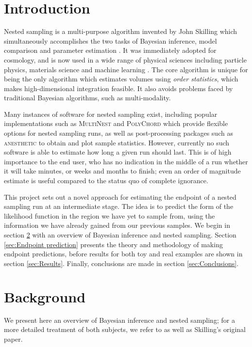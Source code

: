 \documentclass[usenatbib]{mnras} %
\begin{document}
\section{Introduction}
Nested sampling is a multi-purpose algorithm invented by John Skilling which simultaneously accomplishes the two tasks of Bayesian inference, model comparison and parameter estimation \citep{skilling}. It was immediately adopted for cosmology, and is now used in a wide range of physical sciences including particle physics, materials science \citep{physical_scientists} and machine learning \citep{split}. The core algorithm is unique for being the only algorithm which estimates volumes using \textit{order statistics}, which makes high-dimensional integration feasible. It also avoids problems faced by traditional Bayesian algorithms, such as multi-modality.
\par
Many instances of software for nested sampling exist, including popular implementations such as \textsc{MultiNest} \citep{multinest} and \textsc{PolyChord} \citep{polychord} which provide flexible options for nested sampling runs, as well as post-processing packages such as \textsc{anesthetic} \citep{anesthetic} to obtain and plot sample statistics. However, currently no such software is able to estimate how long a given run should last. This is of high importance to the end user, who has no indication in the middle of a run whether it will take minutes, or weeks and months to finish; even an order of magnitude estimate is useful compared to the status quo of complete ignorance.
\par
This project sets out a novel approach for estimating the endpoint of a nested sampling run at an intermediate stage. The idea is to predict the form of the likelihood function in the region we have yet to sample from, using the information we have already gained from our previous samples. We begin in section \ref{sec:Background} with an overview of Bayesian inference and nested sampling. Section \ref{sec:Endpoint prediction} presents the theory and methodology of making endpoint predictions, before results for both toy and real examples are shown in section \ref{sec:Results}. Finally, conclusions are made in section \ref{sec:Conclusions}.  


\section{Background}\label{sec:Background}
\prntlen{\textwidth}
We present here an overview of Bayesian inference and nested sampling; for a more detailed treatment of both subjects, we refer to \citet{sivia} as well as Skilling's original paper. 
\end{document}
